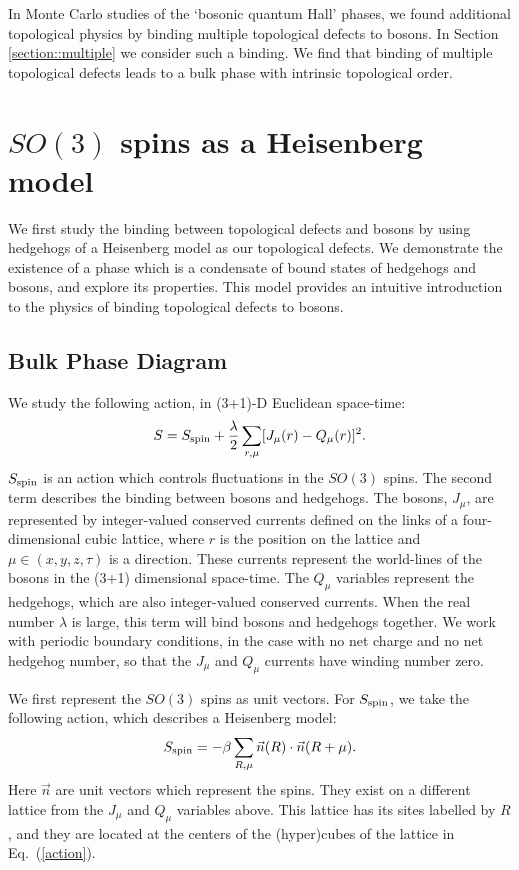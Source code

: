 \documentclass[prb,twocolumn]{revtex4-1}
\begin{document}
In Monte Carlo studies of the `bosonic quantum Hall' phases, we found additional topological physics by binding multiple topological defects to bosons. In Section \ref{section::multiple} we consider such a binding. We find that binding of multiple topological defects leads to a bulk phase with intrinsic topological order.

\section{$SO(3)$ spins as a Heisenberg model}
\label{section::Heisenberg}

We first study the binding between topological defects and bosons by using hedgehogs of a Heisenberg model as our topological defects. We demonstrate the existence of a phase which is a condensate of bound states of hedgehogs and bosons, and explore its properties. This model provides an intuitive introduction to the physics of binding topological defects to bosons. 

\subsection{Bulk Phase Diagram}
\label{subsec::bulkheis}
We study the following action, in (3+1)-D Euclidean space-time:
\begin{equation}
S=S_{\rm spin}+\frac{\lambda}{2}\sum_{r,\mu} [ J_\mu(r)- Q_\mu(r)]^2.
\label{action}
\end{equation}
$S_{\rm spin}$ is an action which controls fluctuations in the $SO(3)$ spins. The second term describes the binding between bosons and hedgehogs. The bosons, $J_\mu$, are represented by integer-valued conserved currents defined on the links of a four-dimensional cubic lattice, where $r$ is the position on the lattice and $\mu\in (x,y,z,\tau)$ is a direction. These currents represent the world-lines of the bosons in the (3+1) dimensional space-time. The $Q_\mu$ variables represent the hedgehogs, which are also integer-valued conserved currents.  When the real number $\lambda$ is large, this term will bind bosons and hedgehogs together. We work with periodic boundary conditions, in the case with no net charge and no net hedgehog number, so that the $J_\mu$ and $Q_\mu$ currents have winding number zero.

We first represent the $SO(3)$ spins as unit vectors. For $S_{\rm spin}$, we take the following action, which describes a Heisenberg model:
\begin{equation}
S_{\rm spin}=-\beta\sum_{R,\mu} \vec{n}(R)\cdot \vec{n}(R+\mu).
\end{equation}
Here $\vec{n}$ are unit vectors which represent the spins. They exist on a different lattice from the $J_\mu$ and $Q_\mu$ variables above. This lattice has its sites labelled by $R$, and they are located at the centers of the (hyper)cubes of the lattice in Eq.~(\ref{action}). 
\end{document}
